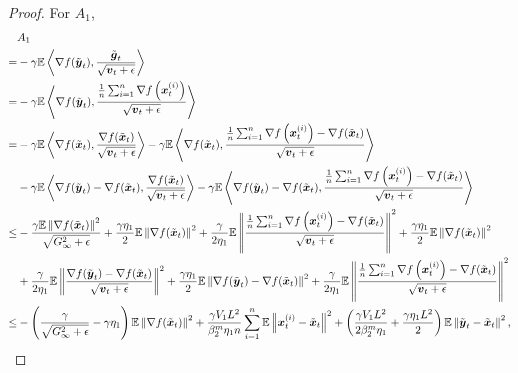 \begin{proof}
For $A_1$,
\begin{align*}
    & A_1 \\
    = & -\gamma \mathbb E\left\langle \nabla f(\tilde{\boldsymbol{y}}_t), \frac{\tilde{\boldsymbol{g}}_{t}}{\sqrt{\boldsymbol{v}_t+\epsilon}}\right\rangle \\
= & -\gamma \mathbb E\left\langle \nabla f(\tilde{\boldsymbol{y}}_t), \frac{\frac{1}{n}\sum_{i=1}^{n}\nabla f\left( \boldsymbol{x}_t^{(i)} \right)}{\sqrt{\boldsymbol{v}_t+\epsilon}}\right\rangle \\
    = & -\gamma \mathbb E\left\langle \nabla f(\tilde{\boldsymbol{x}}_t), \frac{\nabla f(\tilde{\boldsymbol{x}}_t)}{\sqrt{\boldsymbol{v}_t+\epsilon}}\right\rangle -\gamma \mathbb E\left\langle \nabla f(\tilde{\boldsymbol{x}}_t), \frac{\frac{1}{n}\sum_{i=1}^{n}\nabla f\left( \boldsymbol{x}_t^{(i)} \right)-\nabla f(\tilde{\boldsymbol{x}}_t)}{\sqrt{\boldsymbol{v}_t+\epsilon}}\right\rangle \\
    & - \gamma \mathbb E\left\langle \nabla f(\tilde{\boldsymbol{y}}_t)-\nabla f(\tilde{\boldsymbol{x}}_t), \frac{\nabla f(\tilde{\boldsymbol{x}}_t)}{\sqrt{\boldsymbol{v}_t+\epsilon}}\right\rangle - \gamma \mathbb E\left\langle \nabla f(\tilde{\boldsymbol{y}}_t)-\nabla f(\tilde{\boldsymbol{x}}_t), \frac{\frac{1}{n}\sum_{i=1}^{n}\nabla f\left( \boldsymbol{x}_t^{(i)} \right)-\nabla f(\tilde{\boldsymbol{x}}_t)}{\sqrt{\boldsymbol{v}_t+\epsilon}}\right\rangle \\
\leq & -\frac{\gamma\mathbb E\left\| \nabla f(\tilde{\boldsymbol{x}}_t) \right\|^2}{\sqrt{G_\infty^2+\epsilon}}
+ \frac{\gamma\eta_1}{2}\mathbb{E}\left\| \nabla f(\tilde{\boldsymbol{x}}_t) \right\|^2 + \frac{\gamma}{2\eta_1}\mathbb{E}\left\| \frac{\frac{1}{n}\sum_{i=1}^{n}\nabla f\left( \boldsymbol{x}_t^{(i)} \right)-\nabla f(\tilde{\boldsymbol{x}}_t)}{\sqrt{\boldsymbol{v}_t+\epsilon}} \right\|^2
+ \frac{\gamma\eta_1}{2}\mathbb{E}\left\| \nabla f(\tilde{\boldsymbol{x}}_t) \right\|^2 \\
    & + \frac{\gamma}{2\eta_1}\mathbb{E}\left\| \frac{\nabla f(\tilde{\boldsymbol{y}}_t)-\nabla f(\tilde{\boldsymbol{x}}_t)}{\sqrt{\boldsymbol{v}_t+\epsilon}} \right\|^2 + 
    \frac{\gamma\eta_1}{2}\mathbb{E}\left\|\nabla f(\tilde{\boldsymbol{y}}_t)-\nabla f(\tilde{\boldsymbol{x}}_t)\right\|^2 + \frac{\gamma}{2\eta_1}\mathbb{E}\left\|\frac{\frac{1}{n}\sum_{i=1}^{n}\nabla f\left( \boldsymbol{x}_t^{(i)} \right)-\nabla f(\tilde{\boldsymbol{x}}_t)}{\sqrt{\boldsymbol{v}_t+\epsilon}}\right\|^2 \\
\leq & -\left( \frac{\gamma}{\sqrt{G_\infty^2+\epsilon}} - \gamma\eta_1 \right)\mathbb E\left\| \nabla f(\tilde{\boldsymbol{x}}_t) \right\|^2
+ \frac{\gamma V_1L^2}{\beta_2^m\eta_1n}\sum_{i=1}^{n}\mathbb{E}\left\| \boldsymbol{x}_t^{(i)} - \tilde{\boldsymbol{x}}_t \right\|^2 + \left(\frac{\gamma V_1L^2}{2\beta_2^m\eta_1} + \frac{\gamma\eta_1L^2}{2}\right)\mathbb{E}\left\| \tilde{\boldsymbol{y}}_t - \tilde{\boldsymbol{x}}_t \right\|^2,
\end{align*}

\end{proof}
